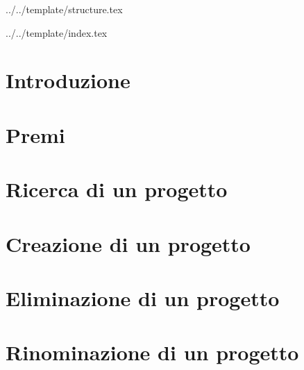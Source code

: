 

\def\DOCUMENTO{Manuale Utente}
\def\VERSIONE{2.0.0}

\def\DESCRIZIONE{Documento che facilita l'utilizzo dell'applicazione da parte dell'utente.}

\def\REDATTORE {Agostinetto Matteo}
\def\VERIFICATORE {Crespan Emanuele}
\def\RESPONSABILE {Suierica Bogdan}

\def\USO {Esterno}

\def\DISTRIBUZIONE {\GRUPPO{}\\ & \COMMITTENTE{}\\ & \PROPONENTE{}\\}


\def\INDICE	{true}
\def\TABELLE {true}
\def\FIGURE {true}


 {../../template/structure.tex}



 {../../template/index.tex}

\section{Introduzione}

\newpage

\section{Premi}

\newpage

\section{Ricerca di un progetto}

\newpage

\section{Creazione di un progetto}


\section{Eliminazione di un progetto}


\section{Rinominazione di un progetto}



